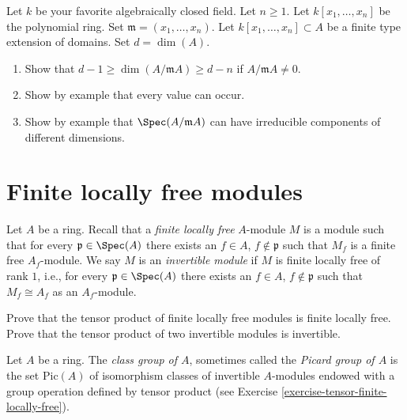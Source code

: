\begin{exercise}
\label{exercise-codim-1}
Let $k$ be your favorite algebraically closed field.
Let $n \geq 1$.
Let $k[x_1, \ldots, x_n]$ be the polynomial ring.
Set $\mathfrak m = (x_1, \ldots, x_n)$.
Let $k[x_1, \ldots, x_n] \subset A$ be a finite type extension of
domains. Set $d = \dim(A)$.
\begin{enumerate}
\item Show that $d - 1 \geq \dim(A/\mathfrak m A) \geq d - n$
if $A/\mathfrak mA \not = 0$.
\item Show by example that every value can occur.
\item Show by example that $\Spec(A/\mathfrak m A)$ can
have irreducible components of different dimensions.
\end{enumerate}
\end{exercise}




\section{Finite locally free modules}
\label{section-finite-locally-free}

\begin{definition}
\label{definition-finite-locally-free}
Let $A$ be a ring. Recall that a {\it finite locally free} $A$-module
$M$ is a module such that for every ${\mathfrak p} \in \Spec(A)$
there exists an
$f\in A$, $f \not \in {\mathfrak p}$ such that $M_f$ is a finite free
$A_f$-module. We say $M$ is an {\it invertible module} if
$M$ is finite locally free of rank $1$, i.e., for every
${\mathfrak p} \in \Spec(A)$ there exists an
$f\in A$, $f \not \in \mathfrak p$ such that $M_f \cong A_f$
as an $A_f$-module.
\end{definition}

\begin{exercise}
\label{exercise-tensor-finite-locally-free}
Prove that the tensor product of finite locally free modules
is finite locally free. Prove that the tensor product of two
invertible modules is invertible.
\end{exercise}

\begin{definition}
\label{definition-class-group}
Let $A$ be a ring. The {\it class group of $A$}, sometimes called
the {\it Picard group of $A$} is the set $\text{Pic}(A)$
of isomorphism classes of invertible $A$-modules endowed with
a group operation defined by tensor product (see
Exercise \ref{exercise-tensor-finite-locally-free}).
\end{definition}

